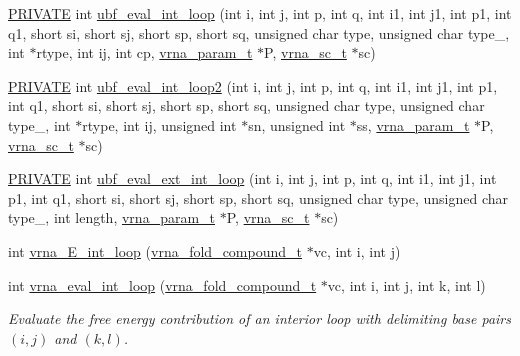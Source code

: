 \begin{DoxyCompactItemize}
\item 
\mbox{\hyperlink{group__utils_ga5e151c615eda34903514212f05a5ccf8}{P\+R\+I\+V\+A\+TE}} int \mbox{\hyperlink{group__loops_ga7023a0172febe830dfca95499d8d1bbb}{ubf\+\_\+eval\+\_\+int\+\_\+loop}} (int i, int j, int p, int q, int i1, int j1, int p1, int q1, short si, short sj, short sp, short sq, unsigned char type, unsigned char type\+\_, int $\ast$rtype, int ij, int cp, \mbox{\hyperlink{group__energy__parameters_ga8a69ca7d787e4fd6079914f5343a1f35}{vrna\+\_\+param\+\_\+t}} $\ast$P, \mbox{\hyperlink{group__soft__constraints_ga75401ce219ef8dbcceb672db82d434c6}{vrna\+\_\+sc\+\_\+t}} $\ast$sc)
\item 
\mbox{\hyperlink{group__utils_ga5e151c615eda34903514212f05a5ccf8}{P\+R\+I\+V\+A\+TE}} int \mbox{\hyperlink{group__loops_gae85ec93c39058ce80d67b64239f64c71}{ubf\+\_\+eval\+\_\+int\+\_\+loop2}} (int i, int j, int p, int q, int i1, int j1, int p1, int q1, short si, short sj, short sp, short sq, unsigned char type, unsigned char type\+\_, int $\ast$rtype, int ij, unsigned int $\ast$sn, unsigned int $\ast$ss, \mbox{\hyperlink{group__energy__parameters_ga8a69ca7d787e4fd6079914f5343a1f35}{vrna\+\_\+param\+\_\+t}} $\ast$P, \mbox{\hyperlink{group__soft__constraints_ga75401ce219ef8dbcceb672db82d434c6}{vrna\+\_\+sc\+\_\+t}} $\ast$sc)
\item 
\mbox{\hyperlink{group__utils_ga5e151c615eda34903514212f05a5ccf8}{P\+R\+I\+V\+A\+TE}} int \mbox{\hyperlink{group__loops_ga0f0ba96735be7e218bed5db4746012fd}{ubf\+\_\+eval\+\_\+ext\+\_\+int\+\_\+loop}} (int i, int j, int p, int q, int i1, int j1, int p1, int q1, short si, short sj, short sp, short sq, unsigned char type, unsigned char type\+\_, int length, \mbox{\hyperlink{group__energy__parameters_ga8a69ca7d787e4fd6079914f5343a1f35}{vrna\+\_\+param\+\_\+t}} $\ast$P, \mbox{\hyperlink{group__soft__constraints_ga75401ce219ef8dbcceb672db82d434c6}{vrna\+\_\+sc\+\_\+t}} $\ast$sc)
\item 
int \mbox{\hyperlink{group__loops_ga8aab34f532276b7e38837d78ef591847}{vrna\+\_\+\+E\+\_\+int\+\_\+loop}} (\mbox{\hyperlink{group__fold__compound_ga1b0cef17fd40466cef5968eaeeff6166}{vrna\+\_\+fold\+\_\+compound\+\_\+t}} $\ast$vc, int i, int j)
\item 
int \mbox{\hyperlink{group__loops_ga018f1314dbbae42fdd27c94670b61721}{vrna\+\_\+eval\+\_\+int\+\_\+loop}} (\mbox{\hyperlink{group__fold__compound_ga1b0cef17fd40466cef5968eaeeff6166}{vrna\+\_\+fold\+\_\+compound\+\_\+t}} $\ast$vc, int i, int j, int k, int l)
\begin{DoxyCompactList}\small\item\em Evaluate the free energy contribution of an interior loop with delimiting base pairs $(i,j)$ and $(k,l)$. \end{DoxyCompactList}\item 

\end{DoxyCompactItemize}
